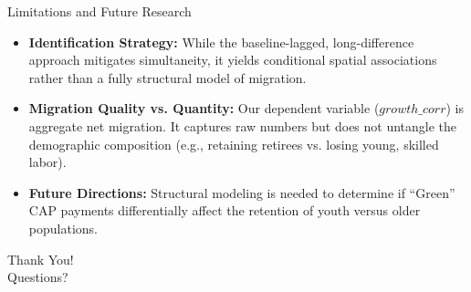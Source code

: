 \documentclass[aspectratio=169]{beamer}
\begin{document}
\begin{frame}{Limitations and Future Research}
    \begin{itemize}
        \item \textbf{Identification Strategy:} While the baseline-lagged, long-difference approach mitigates simultaneity, it yields conditional spatial associations rather than a fully structural model of migration.\pause
        \item \textbf{Migration Quality vs. Quantity:} Our dependent variable ($growth\_corr$) is aggregate net migration. It captures raw numbers but does not untangle the demographic composition (e.g., retaining retirees vs. losing young, skilled labor).\pause
        \item \textbf{Future Directions:} Structural modeling is needed to determine if ``Green'' CAP payments differentially affect the retention of youth versus older populations.
    \end{itemize}
\end{frame}

\begin{frame}
    \centering
    \Huge
    Thank You! \\
    \vspace{0.5cm}
    \Large
    Questions?
\end{frame}
\end{document}

